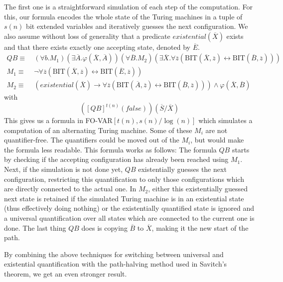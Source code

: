 The first one is a straightforward simulation of each step of the computation.
For this, our formula encodes the whole state of the Turing machines in a tuple of $s(n)$ bit extended variables and iteratively guesses the next configuration.
We also assume without loss of generality that a predicate $existential(\overline{X})$ exists and that there exists exactly one accepting state, denoted by $\overline{E}$.
\[
    \begin{aligned}
        QB \equiv~&(\forall b.M_{1})(\exists\overline{A}.\varphi(\overline{X}, \overline{A}))(\forall \overline{B}.M_{2})(\exists \overline{X}. \forall \overline{z}(\text{BIT}(\overline{X}, \overline{z}) \leftrightarrow \text{BIT}(\overline{B}, \overline{z}))) \\
        M_{1} \equiv~&\neg\forall \overline{z}(\text{BIT}(\overline{X}, \overline{z}) \leftrightarrow \text{BIT}(\overline{E}, \overline{z})) \\
        M_{2} \equiv~& (existential(\overline{X}) \to \forall \overline{z}(\text{BIT}(\overline{A}, \overline{z}) \leftrightarrow \text{BIT}(\overline{B}, \overline{z}))) \land \varphi(\overline{X}, \overline{B})
    \end{aligned}
\]
with \[
         \left([QB]^{t(n)}(false)\right)(\overline{S} / \overline{X})
\]
This gives us a formula in FO-VAR$[t(n), s(n)/\log(n)]$ which simulates a computation of an alternating Turing machine.
Some of these $M_i$ are not quantifier-free.
The quantifiers could be moved out of the $M_i$, but would make the formula less readable.
This formula works as follows:
The formula $QB$ starts by checking if the accepting configuration has already been reached using $M_1$.
Next, if the simulation is not done yet, $QB$ existentially guesses the next configuration, restricting this quantification to only those configurations which are directly connected to the actual one.
In $M_2$, either this existentially guessed next state is retained if the simulated Turing machine is in an existential state (thus effectively doing nothing) or the existentially quantified state is ignored and a universal quantification over all states which are connected to the current one is done.
The last thing $QB$ does is copying $\overline{B}$ to $\overline{X}$, making it the new start of the path.

By combining the above techniques for switching between universal and existential quantification with the path-halving method used in Savitch's theorem, we get an even stronger result.

